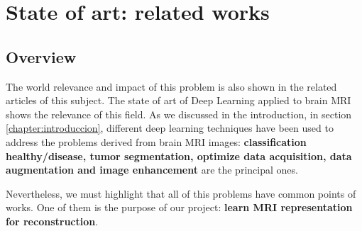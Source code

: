 \chapter{State of art: related works}
\label{chapter:stateofart}

\section{Overview}
The world relevance and impact of this problem is also shown in the related articles of this subject. The state of art of Deep Learning applied to brain MRI shows the relevance of this field. As we discussed in the introduction, in section \ref{chapter:introduccion}, different deep learning techniques have been used to address the problems derived from brain MRI images: \textbf{classification healthy/disease, tumor segmentation, optimize data acquisition, data augmentation and image enhancement} are the principal ones. 

\begin{tcolorbox}
Nevertheless, we must highlight that all of this problems have common points of works. One of them is the purpose of our project: \textbf{learn MRI representation for reconstruction}.
\end{tcolorbox}

